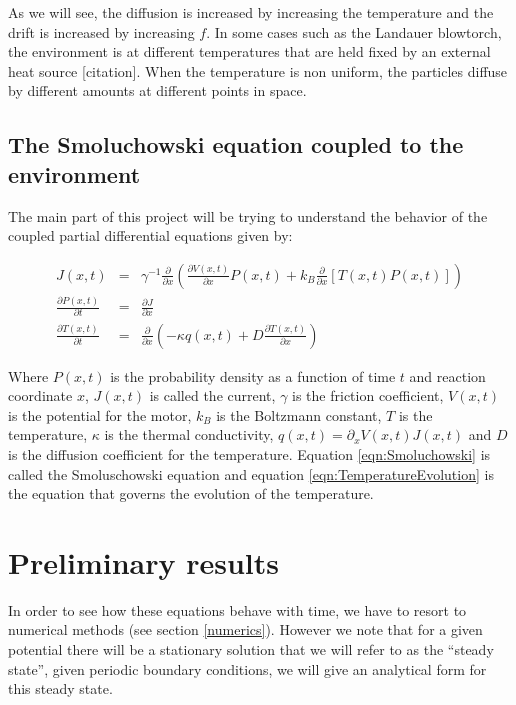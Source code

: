 \documentclass[11pt]{article} %
\begin{document}
As we will see, the diffusion is increased by increasing the temperature and the drift is increased by increasing $f$. In some cases such as the Landauer blowtorch, the environment is at different temperatures that are held fixed by an external heat source [citation]. When the temperature is non uniform, the particles diffuse by different amounts at different points in space.
 
\subsection{The Smoluchowski equation coupled to the environment} \label{Smoluchowski}

The main part of this project will be trying to understand the behavior of the coupled partial differential equations given by:

\begin{eqnarray}
J(x, t) &=& \gamma^{-1} \frac{\partial}{\partial x} \left ( \frac{\partial V(x, t)}{\partial x} P(x, t) + k_B \frac{\partial}{\partial x} \left [T(x, t) P(x, t) \right] \right )  \\
\frac{\partial P(x, t)}{\partial t} &=& \frac{\partial J}{\partial x} \label{eqn:Smoluchowski} \\
\frac{\partial T(x, t)}{\partial t} &=& \frac{\partial}{\partial x} \left ( -\kappa q(x, t) + D \frac{\partial T(x, t)}{\partial x} \right ) \label{eqn:TemperatureEvolution}
\end{eqnarray} 

Where $P(x, t)$ is the probability density as a function of time $t$ and reaction coordinate $x$, $J(x, t)$ is called the current,  $\gamma$ is the friction coefficient, $V(x, t)$ is the potential for the motor, $k_B$ is the Boltzmann constant, $T$ is the temperature, $\kappa$ is the thermal conductivity, $q(x, t) = \partial_x V(x, t) J(x, t)$ and $D$ is the diffusion coefficient for the temperature. Equation \ref{eqn:Smoluchowski} is called the Smoluschowski equation \cite{KellerBustamante2000} and equation \ref{eqn:TemperatureEvolution} is the equation that governs the evolution of the temperature.


\section{Preliminary results}
 In order to see how these equations behave with time, we have to resort to numerical methods (see section \ref{numerics}). However we note that for a given potential there will be a stationary solution that we will refer to as the ``steady state'', given periodic boundary conditions, we will give an analytical form for this steady state. 
\end{document}
